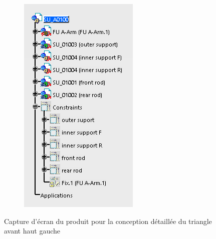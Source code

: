 \begin{figure}
\begin{subfigure}{.25\textwidth}
        \includegraphics[width=\textwidth]{img/tria_tree.png}
    \end{subfigure}{}
    \caption{Capture d'écran du produit pour la conception détaillée du triangle avant haut gauche}
    \label{fig:assemblage_tri}
\end{figure}
